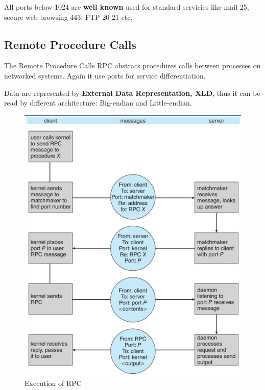 All ports below 1024 are \textbf{well known} used for standard servicies like mail 25, secure web browsing 443, FTP 20 21 etc.

\subsection{Remote Procedure Calls}

The Remote Procedure Calls RPC abstracs procedures calls between processes on networked systems. Again it use ports for service differentiation.

Data are represented by \textbf{External Data Representation, XLD}, thus it can be read by different architecture: Big-endian and Little-endian.

\begin{figure}[htbp]
    \centering
    \includegraphics[width=0.7\linewidth]{img/RPC.png}
    \caption{Execution of RPC}
    
\end{figure}